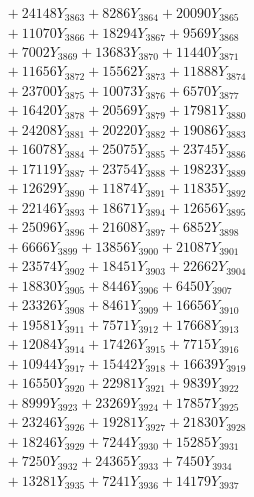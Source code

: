 \documentclass[a4paper,10pt]{article}
\begin{document}
{\begin{align}
&\;  + 24148 Y_{3863} + 8286 Y_{3864} + 20090 Y_{3865} \\[0.3ex]
&\;  + 11070 Y_{3866} + 18294 Y_{3867} + 9569 Y_{3868} \\[0.5ex]\allowbreak
&\;  + 7002 Y_{3869} + 13683 Y_{3870} + 11440 Y_{3871} \\[0.3ex]
&\;  + 11656 Y_{3872} + 15562 Y_{3873} + 11888 Y_{3874} \\[0.3ex]
&\;  + 23700 Y_{3875} + 10073 Y_{3876} + 6570 Y_{3877} \\[0.3ex]
&\;  + 16420 Y_{3878} + 20569 Y_{3879} + 17981 Y_{3880} \\[0.3ex]
&\;  + 24208 Y_{3881} + 20220 Y_{3882} + 19086 Y_{3883} \\[0.3ex]
&\;  + 16078 Y_{3884} + 25075 Y_{3885} + 23745 Y_{3886} \\[0.3ex]
&\;  + 17119 Y_{3887} + 23754 Y_{3888} + 19823 Y_{3889} \\[0.3ex]
&\;  + 12629 Y_{3890} + 11874 Y_{3891} + 11835 Y_{3892} \\[0.3ex]
&\;  + 22146 Y_{3893} + 18671 Y_{3894} + 12656 Y_{3895} \\[0.3ex]
&\;  + 25096 Y_{3896} + 21608 Y_{3897} + 6852 Y_{3898} \\[0.5ex]\allowbreak
&\;  + 6666 Y_{3899} + 13856 Y_{3900} + 21087 Y_{3901} \\[0.3ex]
&\;  + 23574 Y_{3902} + 18451 Y_{3903} + 22662 Y_{3904} \\[0.3ex]
&\;  + 18830 Y_{3905} + 8446 Y_{3906} + 6450 Y_{3907} \\[0.3ex]
&\;  + 23326 Y_{3908} + 8461 Y_{3909} + 16656 Y_{3910} \\[0.3ex]
&\;  + 19581 Y_{3911} + 7571 Y_{3912} + 17668 Y_{3913} \\[0.3ex]
&\;  + 12084 Y_{3914} + 17426 Y_{3915} + 7715 Y_{3916} \\[0.3ex]
&\;  + 10944 Y_{3917} + 15442 Y_{3918} + 16639 Y_{3919} \\[0.3ex]
&\;  + 16550 Y_{3920} + 22981 Y_{3921} + 9839 Y_{3922} \\[0.3ex]
&\;  + 8999 Y_{3923} + 23269 Y_{3924} + 17857 Y_{3925} \\[0.3ex]
&\;  + 23246 Y_{3926} + 19281 Y_{3927} + 21830 Y_{3928} \\[0.5ex]\allowbreak
&\;  + 18246 Y_{3929} + 7244 Y_{3930} + 15285 Y_{3931} \\[0.3ex]
&\;  + 7250 Y_{3932} + 24365 Y_{3933} + 7450 Y_{3934} \\[0.3ex]
&\;  + 13281 Y_{3935} + 7241 Y_{3936} + 14179 Y_{3937} \\[0.3ex]

\end{align}}
\end{document}
